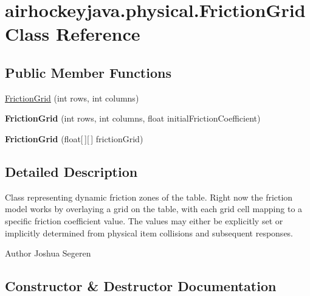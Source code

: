 \hypertarget{classairhockeyjava_1_1physical_1_1_friction_grid}{}\section{airhockeyjava.\+physical.\+Friction\+Grid Class Reference}
\label{classairhockeyjava_1_1physical_1_1_friction_grid}
\subsection*{Public Member Functions}
\begin{DoxyCompactItemize}
\item 
\hyperlink{classairhockeyjava_1_1physical_1_1_friction_grid_ab21b84417140fe1433a60bef25fd97cc}{Friction\+Grid} (int rows, int columns)
\item 
\hypertarget{classairhockeyjava_1_1physical_1_1_friction_grid_ad5c87f8086f0b0017f5c91da959ab248}{}{\bfseries Friction\+Grid} (int rows, int columns, float initial\+Friction\+Coefficient)\label{classairhockeyjava_1_1physical_1_1_friction_grid_ad5c87f8086f0b0017f5c91da959ab248}

\item 
\hypertarget{classairhockeyjava_1_1physical_1_1_friction_grid_a599335be8b4058ba1e83ee06f6183a4a}{}{\bfseries Friction\+Grid} (float\mbox{[}$\,$\mbox{]}\mbox{[}$\,$\mbox{]} friction\+Grid)\label{classairhockeyjava_1_1physical_1_1_friction_grid_a599335be8b4058ba1e83ee06f6183a4a}

\end{DoxyCompactItemize}


\subsection{Detailed Description}
Class representing dynamic friction zones of the table. Right now the friction model works by overlaying a grid on the table, with each grid cell mapping to a specific friction coefficient value. The values may either be explicitly set or implicitly determined from physical item collisions and subsequent responses. \begin{DoxyAuthor}{Author}
Joshua Segeren 
\end{DoxyAuthor}


\subsection{Constructor \& Destructor Documentation}
\hypertarget{classairhockeyjava_1_1physical_1_1_friction_grid_ab21b84417140fe1433a60bef25fd97cc}{}
